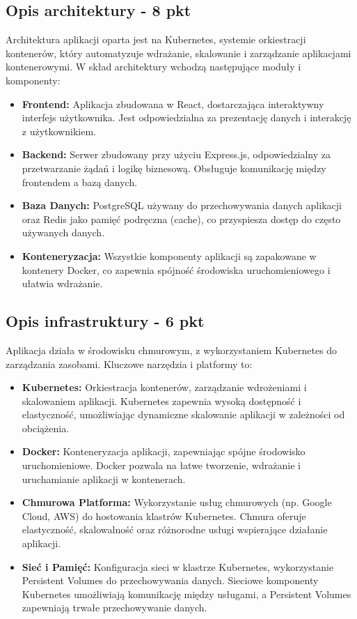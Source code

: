 \documentclass[12pt,a4paper]{article}
\begin{document}
\subsection{Opis architektury - 8 pkt}
\label{sec:introduction}
Architektura aplikacji oparta jest na Kubernetes, systemie orkiestracji kontenerów, który automatyzuje wdrażanie, skalowanie i zarządzanie aplikacjami kontenerowymi. W skład architektury wchodzą następujące moduły i komponenty:

\begin{itemize}
    \item \textbf{Frontend:} Aplikacja zbudowana w React, dostarczająca interaktywny interfejs użytkownika. Jest odpowiedzialna za prezentację danych i interakcję z użytkownikiem.
    \item \textbf{Backend:} Serwer zbudowany przy użyciu Express.js, odpowiedzialny za przetwarzanie żądań i logikę biznesową. Obsługuje komunikację między frontendem a bazą danych.
    \item \textbf{Baza Danych:} PostgreSQL używany do przechowywania danych aplikacji oraz Redis jako pamięć podręczna (cache), co przyspiesza dostęp do często używanych danych.
    \item \textbf{Konteneryzacja:} Wszystkie komponenty aplikacji są zapakowane w kontenery Docker, co zapewnia spójność środowiska uruchomieniowego i ułatwia wdrażanie.
\end{itemize}

\subsection{Opis infrastruktury - 6 pkt}
\label{sec:Users}
Aplikacja działa w środowisku chmurowym, z wykorzystaniem Kubernetes do zarządzania zasobami. Kluczowe narzędzia i platformy to:

\begin{itemize}
    \item \textbf{Kubernetes:} Orkiestracja kontenerów, zarządzanie wdrożeniami i skalowaniem aplikacji. Kubernetes zapewnia wysoką dostępność i elastyczność, umożliwiając dynamiczne skalowanie aplikacji w zależności od obciążenia.
    \item \textbf {Docker:} Konteneryzacja aplikacji, zapewniając spójne środowisko uruchomieniowe. Docker pozwala na łatwe tworzenie, wdrażanie i uruchamianie aplikacji w kontenerach.
    \item \textbf {Chmurowa Platforma:} Wykorzystanie usług chmurowych (np. Google Cloud, AWS) do hostowania klastrów Kubernetes. Chmura oferuje elastyczność, skalowalność oraz różnorodne usługi wspierające działanie aplikacji.
    \item \textbf {Sieć i Pamięć:} Konfiguracja sieci w klastrze Kubernetes, wykorzystanie Persistent Volumes do przechowywania danych. Sieciowe komponenty Kubernetes umożliwiają komunikację między usługami, a Persistent Volumes zapewniają trwałe przechowywanie danych.
\end{itemize}
\end{document}

